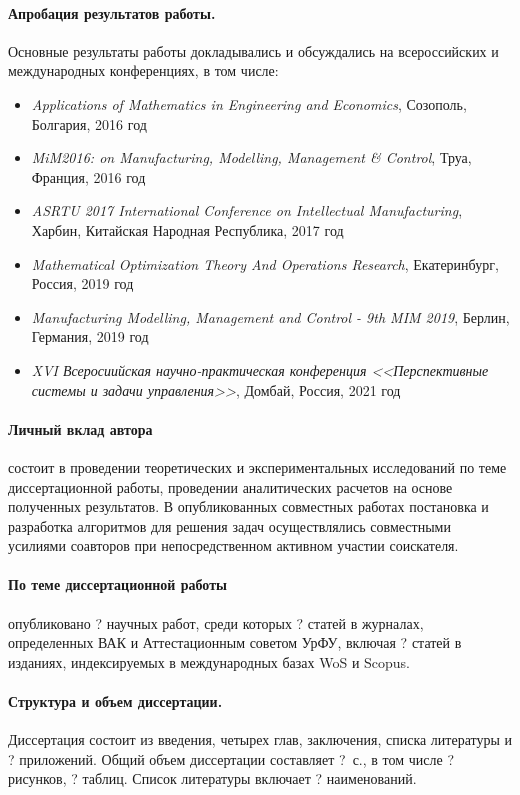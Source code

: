 \documentclass[14pt]{extarticle}
\begin{document}
\paragraph*{Апробация результатов работы.}
Основные результаты работы докладывались и обсуждались на всероссийских и международных конференциях, в том числе:

\begin{itemize}
    \item
    \textit{Applications of Mathematics in Engineering and Economics},
    Созополь, Болгария, 2016 год
    \item
    \textit{MiM2016: on Manufacturing, Modelling, Management \& Control},
    Труа, Франция, 2016 год
    \item
    \textit{ASRTU 2017 International Conference on Intellectual Manufacturing},
    Харбин, Китайская Народная Республика, 2017 год
    \item
    \textit{Mathematical Optimization Theory And Operations Research},
    Екатеринбург, Россия, 2019 год
    \item
    \textit{Manufacturing Modelling, Management and Control - 9th MIM 2019},
    Берлин, Германия, 2019 год
    \item
    \textit{XVI Всеросиийская научно-практическая конференция 
    <<Перспективные системы и задачи управления>>},
    Домбай, Россия, 2021 год
\end{itemize}

\paragraph*{Личный вклад автора}
состоит в проведении теоретических и экспериментальных исследований 
по теме диссертационной работы, 
проведении аналитических расчетов на основе полученных результатов.
В опубликованных совместных работах постановка и разработка алгоритмов для
решения задач осуществлялись совместными усилиями соавторов 
при непосредственном активном участии соискателя.

\paragraph*{По теме диссертационной работы}
опубликовано ? научных работ, 
среди которых ? статей в журналах, определенных ВАК и Аттестационным советом УрФУ, 
включая ? статей в изданиях, индексируемых в международных базах WoS и Scopus.

\paragraph*{Структура и объем диссертации.}
Диссертация состоит из введения, 
четырех глав, заключения, списка литературы и ? приложений. 
Общий объем диссертации составляет ?~с., 
в том числе ? рисунков, ? таблиц. 
Список литературы включает ? наименований.
\end{document}
